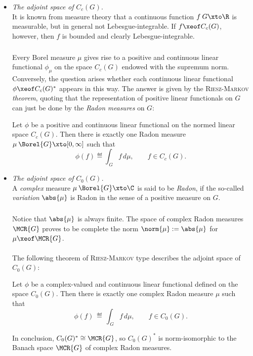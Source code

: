\documentclass[11pt,twoside]{article}
\def\G{G}
\begin{document}
\begin{itemize}[leftmargin=12pt,itemsep=5pt]
\item[1.] \textit{The adjoint space of $C_c(\G)$.}\\
It is known from measure theory
that a continuous function $f\:\G \xto \R$ is measurable,
but in general not Lebesgue-integrable.
If $f \xeof C_c(\G)$,
however,
then $f$ is bounded and clearly Lebesgue-integrable.

\subparagraph{} %
Every Borel measure $\mu$ gives rise to
a positive and continuous linear functional $\phi_{\mu}$
on the space $C_c(\G)$ endowed with the supremum norm.
Conversely,
the question arises
whether each continuous linear functional $\phi \xeof C_c(\G)^*$
appears in this way.
The answer is given by the \textsc{Riesz-Markov} \textit{theorem},
quoting
that the representation of positive linear functionals on $\G$
can just be done by the \textit{Radon measures} on $\G$:

\begin{theorem1}\label{III_RIESZ-MARKOV_THEOREM_1}
Let $\phi$ be a positive and continuous linear functional
on the normed linear space $C_c(\G)$.
Then there is exactly one Radon measure
$\mu\:\Borel{\G} \xto [0,\infty]$ such that
\[
\phi(f) \eqdef \int_{\,\G} f \, d\mu, \quad \quad f \in C_c(\G).
\]
\end{theorem1}

\item[2.] \textit{The adjoint space of $C_0(\G)$.}\\
A \textit{complex} measure $\mu \: \Borel{\G} \xto \C$
is said to be \textit{Radon},
if the so-called \textit{variation} $\abs{\mu} $
is Radon in the sense of a positive measure on $\G$.

\subparagraph{}
Notice that $\abs{\mu} $ is always finite.
The space of complex Radon measures $\MCR{\G}$
proves to be complete {\wrt} the norm $\norm{\mu} := \abs{\mu} $
for $\mu \xeof \MCR{\G}$.

\paragraph{} %
The following theorem of \textsc{Riesz-Markov} type
describes the adjoint space of $C_0(\G)$:

\begin{theorem1}\label{III_RIESZ_MARKOV-THEOREM_2}
Let $\phi$ be a complex-valued and continuous linear functional
defined on the space $C_0(\G)$.
Then there is exactly one complex Radon measure $\mu$ such that
\[
\phi(f) \, \eqdef \, \int_{\,\G} f \, d\mu, \quad \quad f \in C_0(\G).
\]
\end{theorem1}
In conclusion,
$C_0(\G)^* \cong \MCR{\G}$,
so $C_0(\G)^*$ is norm-isomorphic to the Banach space $\MCR{\G}$
of complex Radon measures.


\end{itemize}
\end{document}
